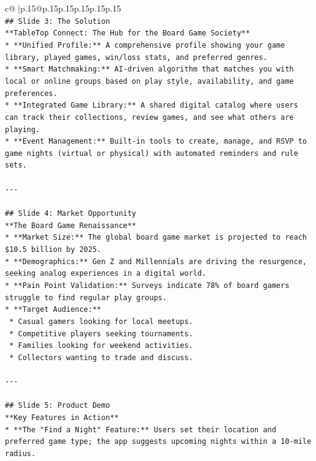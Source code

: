 \documentclass{article}
\begin{document}
{\begin{supertabular}{c@{$\;$}|p{.15\linewidth}@{}p{.15\linewidth}p{.15\linewidth}p{.15\linewidth}p{.15\linewidth}p{.15\linewidth}}
{{{\\ 
\texttt{\#\# Slide 3: The Solution} \\
\texttt{**TableTop Connect: The Hub for the Board Game Society**} \\
\texttt{*   **Unified Profile:** A comprehensive profile showing your game library, played games, win/loss stats, and preferred genres.} \\
\texttt{*   **Smart Matchmaking:** AI{-}driven algorithm that matches you with local or online groups based on play style, availability, and game preferences.} \\
\texttt{*   **Integrated Game Library:** A shared digital catalog where users can track their collections, review games, and see what others are playing.} \\
\texttt{*   **Event Management:** Built{-}in tools to create, manage, and RSVP to game nights (virtual or physical) with automated reminders and rule sets.} \\
\\ 
\texttt{{-}{-}{-}} \\
\\ 
\texttt{\#\# Slide 4: Market Opportunity} \\
\texttt{**The Board Game Renaissance**} \\
\texttt{*   **Market Size:** The global board game market is projected to reach \$10.5 billion by 2025.} \\
\texttt{*   **Demographics:** Gen Z and Millennials are driving the resurgence, seeking analog experiences in a digital world.} \\
\texttt{*   **Pain Point Validation:** Surveys indicate 78\% of board gamers struggle to find regular play groups.} \\
\texttt{*   **Target Audience:**} \\
\texttt{    *   Casual gamers looking for local meetups.} \\
\texttt{    *   Competitive players seeking tournaments.} \\
\texttt{    *   Families looking for weekend activities.} \\
\texttt{    *   Collectors wanting to trade and discuss.} \\
\\ 
\texttt{{-}{-}{-}} \\
\\ 
\texttt{\#\# Slide 5: Product Demo} \\
\texttt{**Key Features in Action**} \\
\texttt{*   **The "Find a Night" Feature:** Users set their location and preferred game type; the app suggests upcoming nights within a 10{-}mile radius.} \\
}}}
\end{supertabular}}
\end{document}
